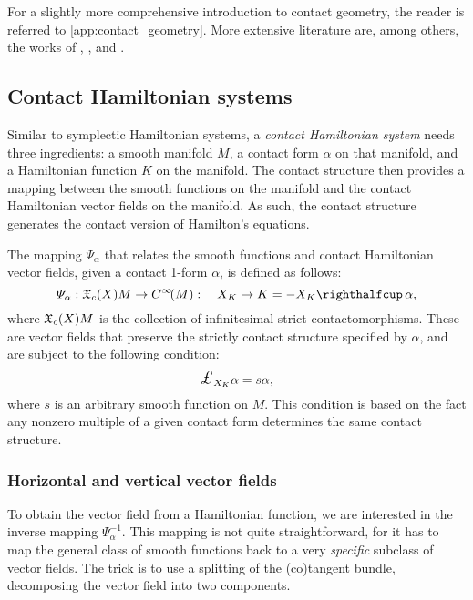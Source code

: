 For a slightly more comprehensive introduction to contact geometry, the reader is referred to \cref{app:contact_geometry}. More extensive literature are, among others, the works of \citet{Geiges2008}, \citet{Libermann1987}, \citet{Arnold1989,Arnold1989a} and \citet{Godbillon1969}.

\subsection{Contact Hamiltonian systems}
\label{ssec:contact_ham_systems}
Similar to symplectic Hamiltonian systems, a \emph{contact Hamiltonian system} needs three ingredients: a smooth manifold \(M\), a contact form \(\alpha\) on that manifold, and a Hamiltonian function \(K\) on the manifold. The contact structure then provides a mapping between the smooth functions on the manifold and the contact Hamiltonian vector fields on the manifold. As such, the contact structure generates the contact version of Hamilton's equations.

The mapping \(\Psi_\alpha\) that relates the smooth functions and contact Hamiltonian vector fields, given a contact 1-form \(\alpha\), is defined as follows:
\begin{equation}
    \Psi_\alpha: \vsfields{c}{X}{M} \to \functions{M}: \quad X_K \mapsto K = -\intpr{X_K}{\alpha}, 
    \label{eq:psi_definition}
\end{equation}
where \(\mathfrak{X}_{c}\qty(X){M}\) is the collection of infinitesimal strict contactomorphisms. These are vector fields that preserve the strictly contact structure specified by \(\alpha\), and are subject to the following condition:
\begin{equation}
    \lied{X_K}{\alpha} = s \alpha, 
    \label{eq:contact_vf_condition}
\end{equation}
where \(s\) is an arbitrary smooth function on \(M\). This condition is based on the fact any nonzero multiple of a given contact form determines the same contact structure.

\subsubsection{Horizontal and vertical vector fields} 
To obtain the vector field from a Hamiltonian function, we are interested in the inverse mapping \(\Psi^{-1}_\alpha\). This mapping is not quite straightforward, for it has to map the general class of smooth functions back to a very \emph{specific} subclass of vector fields. The trick is to use a splitting of the (co)tangent bundle, decomposing the vector field into two components. 

